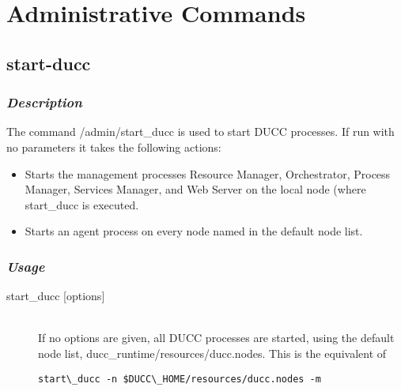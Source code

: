 
\section{Administrative Commands}

\subsection{start-ducc}

    \subsubsection{{\em Description}}
    The command \ducchome/admin/start\_ducc is used to start DUCC processes. If run with no parameters
    it takes the following actions:
    \begin{itemize}
      \item Starts the management processes Resource Manager, Orchestrator, Process Manager,      
      Services Manager, and Web Server on the local node (where start\_ducc is executed.       
      \item Starts an agent process on every node named in the default node list. 
    \end{itemize}

    \subsubsection{{\em Usage}}

    \begin{description}
      \item[start\_ducc {[options]}] \hfill \\ 
        If no options are given, all DUCC processes are started, using the default node list, 
        ducc\_runtime/resources/ducc.nodes. This is the equivalent of 
\begin{verbatim}
start\_ducc -n $DUCC\_HOME/resources/ducc.nodes -m 
\end{verbatim}
      \end{description}
      
